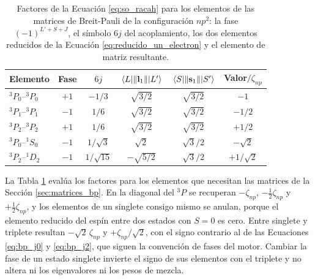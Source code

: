 \begin{table}[htbp]
    \centering
    \begin{tabular}{lccccc}
        \toprule
        \textbf{Elemento} & \textbf{Fase} & $6j$ & $\mel{L}{\|\mathbf{l}_1\|}{L'}$ & $\mel{S}{\|\mathbf{s}_1\|}{S'}$ & \textbf{Valor}$/\zeta_{np}$ \\
        \midrule
        $^3P_0$--$^3P_0$ & $+1$ & $-1/3$ & $\sqrt{3/2}$ & $\sqrt{3/2}$ & $-1$ \\
        $^3P_1$--$^3P_1$ & $-1$ & $1/6$ & $\sqrt{3/2}$ & $\sqrt{3/2}$ & $-1/2$ \\
        $^3P_2$--$^3P_2$ & $+1$ & $1/6$ & $\sqrt{3/2}$ & $\sqrt{3/2}$ & $+1/2$ \\
        $^3P_0$--$^1S_0$ & $-1$ & $1/\sqrt{3}$ & $\sqrt{2}$ & $\sqrt{3}/2$ & $-\sqrt{2}$ \\
        $^3P_2$--$^1D_2$ & $-1$ & $1/\sqrt{15}$ & $-\sqrt{5/2}$ & $\sqrt{3}/2$ & $+1/\sqrt{2}$ \\
        \bottomrule
    \end{tabular}
    \caption[Elementos de matriz del espín-órbita en la configuración $np^2$]{Factores de la Ecuación \eqref{eq:so_racah} para los elementos de las matrices de Breit-Pauli de la configuración $np^2$: la fase $(-1)^{L'+S+J}$, el símbolo $6j$ del acoplamiento, los dos elementos reducidos de la Ecuación \eqref{eq:reducido_un_electron} y el elemento de matriz resultante.}
    \label{tab:so_racah}
\end{table}

La Tabla \ref{tab:so_racah} evalúa los factores para los elementos que necesitan las matrices de la Sección \ref{sec:matrices_bp}. En la diagonal del $^3P$ se recuperan $-\zeta_{np}$, $-\tfrac{1}{2}\zeta_{np}$ y $+\tfrac{1}{2}\zeta_{np}$, y los elementos de un singlete consigo mismo se anulan, porque el elemento reducido del espín entre dos estados con $S=0$ es cero. Entre singlete y triplete resultan $-\sqrt{2}\,\zeta_{np}$ y $+\zeta_{np}/\sqrt{2}$, con el signo contrario al de las Ecuaciones \eqref{eq:bp_j0} y \eqref{eq:bp_j2}, que siguen la convención de fases del motor. Cambiar la fase de un estado singlete invierte el signo de sus elementos con el triplete y no altera ni los eigenvalores ni los pesos de mezcla.

